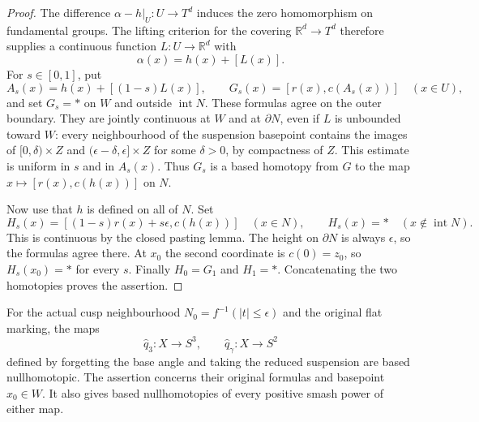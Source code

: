 \begin{proof}
The difference $\alpha-h|_U:U\to T^d$ induces the zero homomorphism
on fundamental groups. The lifting criterion for the covering
$\mathbb R^d\to T^d$ therefore supplies a continuous function
$L:U\to\mathbb R^d$ with
\[
 \alpha(x)=h(x)+[L(x)].
\]
For $s\in[0,1]$, put
\[
 A_s(x)=h(x)+[(1-s)L(x)],\qquad
 G_s(x)=[r(x),c(A_s(x))]\quad(x\in U),
\]
and set $G_s=*$ on $W$ and outside $\operatorname{int}N$.
These formulas agree on the outer boundary. They are jointly continuous
at $W$ and at $\partial N$, even if $L$ is unbounded toward $W$:
every neighbourhood of the suspension basepoint contains the images of
$[0,\delta)\times Z$ and $(\epsilon-\delta,\epsilon]\times Z$
for some $\delta>0$, by compactness of $Z$. This estimate is uniform
in $s$ and in $A_s(x)$. Thus $G_s$ is a based homotopy from $G$
to the map $x\mapsto[r(x),c(h(x))]$ on $N$.

Now use that $h$ is defined on all of $N$. Set
\[
 H_s(x)=[(1-s)r(x)+s\epsilon,c(h(x))]
 \quad(x\in N),
 \qquad H_s(x)=*\quad(x\notin\operatorname{int}N).
\]
This is continuous by the closed pasting lemma. The height on
$\partial N$ is always $\epsilon$, so the formulas agree there.
At $x_0$ the second coordinate is $c(0)=z_0$, so $H_s(x_0)=*$
for every $s$. Finally $H_0=G_1$ and $H_1=*$.
Concatenating the two homotopies proves the assertion.
\end{proof}

\begin{proposition}
\label{mapsIII:angle-forgotten-one-copy-null}
For the actual cusp neighbourhood $N_0=f^{-1}(|t|\leq\epsilon)$ and
the original flat marking, the maps
\[
 \widehat q_3:X\longrightarrow S^3,
 \qquad
 \widehat q_\gamma:X\longrightarrow S^2
\]
defined by forgetting the base angle and taking the reduced suspension
are based nullhomotopic. The assertion concerns their original formulas
and basepoint $x_0\in W$. It also gives based nullhomotopies of every
positive smash power of either map.
\end{proposition}

